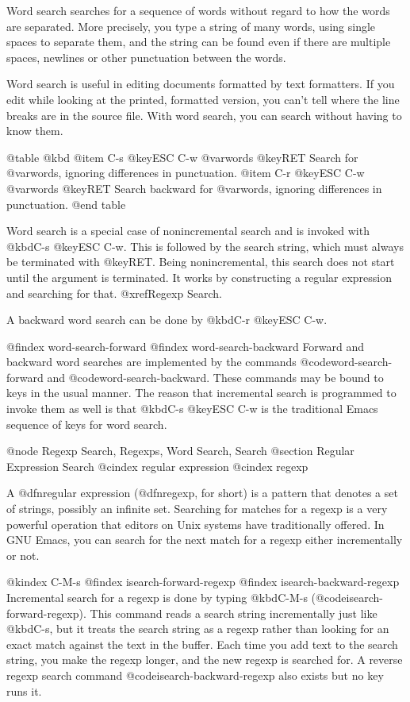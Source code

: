 {{{{{{{{  Word search searches for a sequence of words without regard to how the
words are separated.  More precisely, you type a string of many words,
using single spaces to separate them, and the string can be found even if
there are multiple spaces, newlines or other punctuation between the words.

  Word search is useful in editing documents formatted by text formatters.
If you edit while looking at the printed, formatted version, you can't tell
where the line breaks are in the source file.  With word search, you can
search without having to know them.

@table @kbd
@item C-s @key{ESC} C-w @var{words} @key{RET}
Search for @var{words}, ignoring differences in punctuation.
@item C-r @key{ESC} C-w @var{words} @key{RET}
Search backward for @var{words}, ignoring differences in punctuation.
@end table

  Word search is a special case of nonincremental search and is invoked
with @kbd{C-s @key{ESC} C-w}.  This is followed by the search string, which
must always be terminated with @key{RET}.  Being nonincremental, this
search does not start until the argument is terminated.  It works by
constructing a regular expression and searching for that.  @xref{Regexp
Search}.

  A backward word search can be done by @kbd{C-r @key{ESC} C-w}.

@findex word-search-forward
@findex word-search-backward
  Forward and backward word searches are implemented by the commands
@code{word-search-forward} and @code{word-search-backward}.  These commands
may be bound to keys in the usual manner.  The reason that incremental
search is programmed to invoke them as well is that @kbd{C-s @key{ESC} C-w}
is the traditional Emacs sequence of keys for word search.

@node Regexp Search, Regexps, Word Search, Search
@section Regular Expression Search
@cindex regular expression
@cindex regexp

  A @dfn{regular expression} (@dfn{regexp}, for short) is a pattern that
denotes a set of strings, possibly an infinite set.  Searching for matches
for a regexp is a very powerful operation that editors on Unix systems have
traditionally offered.  In GNU Emacs, you can search for the next match for
a regexp either incrementally or not.

@kindex C-M-s
@findex isearch-forward-regexp
@findex isearch-backward-regexp
  Incremental search for a regexp is done by typing @kbd{C-M-s}
(@code{isearch-forward-regexp}).  This command reads a search string
incrementally just like @kbd{C-s}, but it treats the search string as a
regexp rather than looking for an exact match against the text in the
buffer.  Each time you add text to the search string, you make the regexp
longer, and the new regexp is searched for.  A reverse regexp search command
@code{isearch-backward-regexp} also exists but no key runs it.

}}}}}}}}
